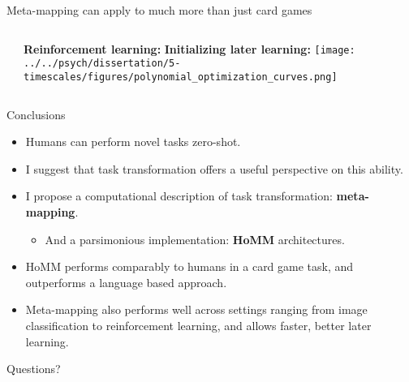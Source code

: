 \documentclass{beamer}
\begin{document}
\begin{frame}{Meta-mapping can apply to much more than just card games}
\begin{columns}
\begin{column}{0.5\textwidth}
{\begin{tikzpicture}[auto, scale=0.8, every node/.style={scale=0.8}]
\end{tikzpicture}
}
\end{column}%
\begin{column}{0.5\textwidth}
\textbf{Reinforcement learning:}
\textbf{Initializing later learning:}
\texttt{[image: ../../psych/dissertation/5-timescales/figures/polynomial\_optimization\_curves.png]}
\end{column}

\end{columns}

\end{frame}

\begin{frame}{Conclusions}

\begin{itemize}
\item Humans can perform novel tasks zero-shot. 
\item I suggest that task transformation offers a useful perspective on this ability. 
\item I propose a computational description of task transformation: \textbf{meta-mapping}.
    \begin{itemize}
        \item And a parsimonious implementation: \textbf{HoMM} architectures. 
    \end{itemize}
\item HoMM performs comparably to humans in a card game task, and outperforms a language based approach.
\item Meta-mapping also performs well across settings ranging from image classification to reinforcement learning, and allows faster, better later learning. 
\end{itemize}
\end{frame}

\begin{frame}[standout]
Questions?
\end{frame}
\end{document}
